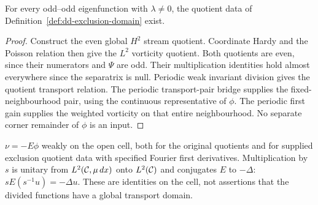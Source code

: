\begin{corollary}
\label{cor:dd-exclusion-domain}
\leanok
For every odd--odd eigenfunction with $\lambda\ne0$, the quotient data of
Definition~\ref{def:dd-exclusion-domain} exist.
\end{corollary}

\begin{proof}
\leanok
Construct the even global $H^2$ stream quotient. Coordinate Hardy and the
Poisson relation then give the $L^2$ vorticity quotient. Both quotients are
even, since their numerators and $\Psi$ are odd. Their multiplication
identities hold almost everywhere since the separatrix is null.
Periodic weak invariant division gives the quotient transport relation.
The periodic transport-pair bridge supplies the fixed-neighbourhood pair,
using the continuous representative of $\phi$. The periodic first gain
supplies the weighted vorticity on that entire neighbourhood.
No separate corner remainder of $\phi$ is an input.
\end{proof}

\begin{lemma}
\label{lem:dd-quotient-equations}
\leanok
$\nu=-E\phi$ weakly on the open cell, both for the original quotients
and for supplied exclusion quotient data with specified Fourier first derivatives.
Multiplication by $s$ is unitary from
$L^2(\mathcal{C},\mu\,dx)$ onto $L^2(\mathcal{C})$ and conjugates $E$ to $-\Delta$:
$sE(s^{-1}u)=-\Delta u$. These are identities on the cell, not assertions
that the divided functions have a global transport domain.
\end{lemma}

